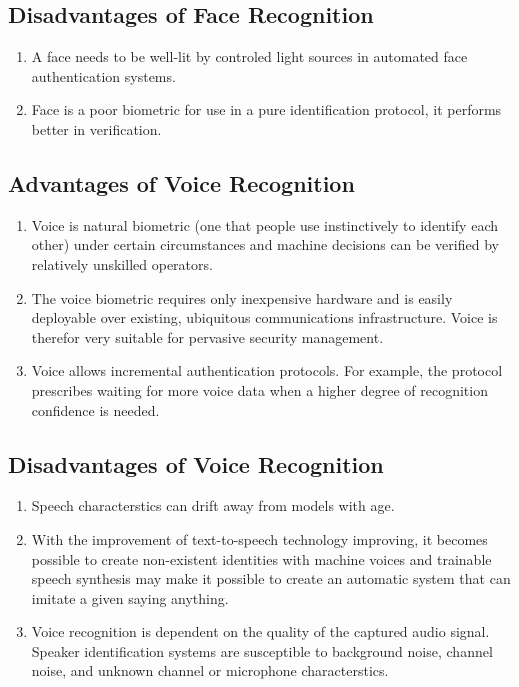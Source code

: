 \subsection{Disadvantages of Face Recognition}

\begin{enumerate}
  \item A face needs to be well-lit by controled light sources in automated face authentication systems.
  \item Face is a poor biometric for use in a pure identification protocol, it performs better in verification.
\end{enumerate}

\subsection{Advantages of Voice Recognition}

\begin{enumerate}
  \item Voice is  natural biometric (one that people use instinctively to identify each other) under certain circumstances and machine decisions can be verified by relatively unskilled operators.
  \item The voice biometric requires only inexpensive hardware and is easily deployable over existing, ubiquitous communications infrastructure. Voice is therefor very suitable for pervasive security management.
  \item Voice allows incremental authentication protocols. For example, the protocol prescribes waiting for more voice data when a higher degree of recognition confidence is needed.
\end{enumerate}

\subsection{Disadvantages of Voice Recognition}

\begin{enumerate}
  \item Speech characterstics can drift away from models with age.
  \item With the improvement of text-to-speech technology improving, it becomes possible to create non-existent identities with machine voices and trainable speech synthesis may make it possible to create an automatic system that can imitate a given saying anything.
  \item Voice recognition is dependent on the quality of the captured audio signal. Speaker identification systems are susceptible to background noise, channel noise, and unknown channel or microphone characterstics.
\end{enumerate}
